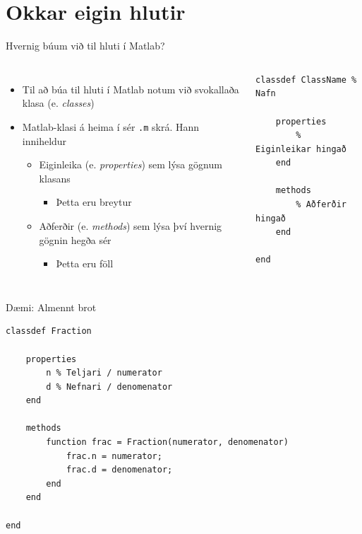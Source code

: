 \documentclass{beamer}
\begin{document}
\section{Okkar eigin hlutir}

\begin{frame}[fragile]{Hvernig búum við til hluti í Matlab?}
\begin{columns}
\begin{itemize}
 \item Til að búa til hluti í Matlab notum við svokallaða klasa (e. \emph{classes})
 \item Matlab-klasi á heima í sér \texttt{.m} skrá. Hann inniheldur
 \begin{itemize}
  \item Eiginleika (e. \emph{properties}) sem lýsa gögnum klasans
  \begin{itemize}
   \item Þetta eru breytur
  \end{itemize}
  \item Aðferðir (e. \emph{methods}) sem lýsa því hvernig gögnin hegða sér
  \begin{itemize}
   \item Þetta eru föll
  \end{itemize}
 \end{itemize}
\end{itemize}
\begin{verbatim}
classdef ClassName % Nafn

    properties
        % Eiginleikar hingað
    end
    
    methods
        % Aðferðir hingað
    end
    
end
\end{verbatim}

\end{columns}
\end{frame}

\begin{frame}[fragile]{Dæmi: Almennt brot}
\begin{verbatim}
classdef Fraction

    properties
        n % Teljari / numerator
        d % Nefnari / denomenator
    end
    
    methods
        function frac = Fraction(numerator, denomenator)
            frac.n = numerator;
            frac.d = denomenator;
        end
    end
    
end
\end{verbatim}

\end{frame}
\end{document}

